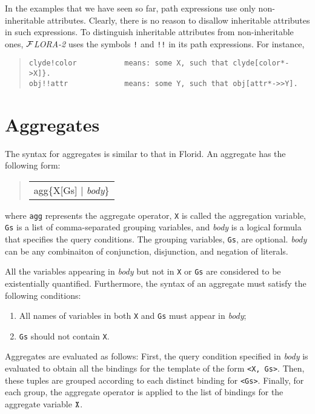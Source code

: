 \documentclass[11pt]{article}
\newenvironment{qrules}{\begin{quote}\tt\begin{tabular}[t]{l}}%
{\end{tabular}\end{quote}}
\newcommand{\FLORA}{{\mbox{${\cal F}${\small\it LORA}\rm\emph{-2}}}\xspace}
\newcommand{\FLORID}{{\mbox{\sc Florid}}\xspace}
\begin{document}
In the examples that we have seen so far, path expressions use only
non-inheritable attributes. Clearly, there is no reason to disallow
inheritable attributes in such expressions. To distinguish inheritable
attributes from non-inheritable ones, \FLORA uses the symbols
{\tt !} and {\tt !!} in its path expressions. For instance,
\begin{quote}
\begin{verbatim}
clyde!color           means: some X, such that clyde[color*->X]}.
obj!!attr             means: some Y, such that obj[attr*->>Y].
\end{verbatim}
\end{quote}



\section{Aggregates}


The syntax for aggregates is similar to that in \FLORID. An
aggregate has the following form:
\begin{qrules}
agg\{X[Gs] $|$ {\it body}\}
\end{qrules}
%
where {\tt agg} represents the aggregate operator, {\tt X} is called the
aggregation variable, {\tt Gs} is a list of comma-separated grouping
variables, and {\it body} is a logical formula that specifies the
query conditions. The grouping variables, {\tt Gs}, are optional. {\it body}
can be any combinaiton of conjunction, disjunction, and negation of literals.

All the variables appearing in {\it body} but not in {\tt X} or {\tt Gs} are
considered to be existentially quantified. Furthermore, the syntax of an
aggregate must satisfy the following conditions:
\begin{enumerate}
\item All names of variables in both {\tt X} and {\tt Gs} must
appear in {\it body};
\item {\tt Gs} should not contain {\tt X}.
\end{enumerate}

Aggregates are evaluated as follows: First, the query
condition specified in {\it body} is evaluated to obtain all the bindings
for the template of the form {\tt \texttt{<}X, Gs\texttt{>}}. Then, these
tuples are grouped according to each distinct binding for
{\tt \texttt{<}Gs\texttt{>}}. Finally, for each group, the aggregate operator
is applied to the list of bindings for the aggregate variable $\tt X$.
\end{document}
